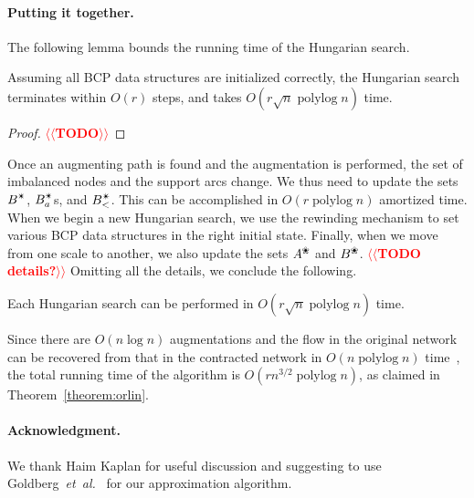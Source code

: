 \documentclass[11pt]{article}
\makeatletter
\def\etal{\emph{et~al.}}
\def\etal{\textit{et~al.}}
\def\polylog{\mathop{\mathrm{polylog}}}
\def\alive#1{{#1}^\text{\ding{96}}}
\def\star{\text{\ding{84}}}
\theoremstyle{plain}
\numberwithin{figure}{section}
\def\n@te#1{\textsf{\boldmath \textbf{$\langle\!\langle$#1$\rangle\!\rangle$}}\leavevmode}
\def\note#1{\textcolor{red}{\n@te{#1}}}
\makeatother
\begin{document}
\paragraph*{Putting it together.}
The following lemma bounds the running time of the Hungarian search.

\begin{lemma}
Assuming all BCP data structures are initialized correctly, the Hungarian search
terminates within $O(r)$ steps, and takes $O(r\sqrt{n}\polylog n)$ time.
\end{lemma}
\begin{proof}
\note{TODO} %
\end{proof}

Once an augmenting path is found and the augmentation is performed, the set of
imbalanced nodes and the support arcs change.
We thus need to update the sets $B^\star$, $B_a^\star$s, and $B_<^\star$.
This can be accomplished in $O(r\polylog n)$ amortized time.
When we begin a new Hungarian search, we use the rewinding mechanism
to set various BCP data structures in the right initial state.
Finally, when we move from one scale to another, we also update the sets
$\alive{A}$ and $\alive{B}$.
\note{TODO details?} %
Omitting all the details, we conclude the following.

\begin{lemma}
Each Hungarian search can be performed in $O(r\sqrt{n}\polylog n)$ time.
\end{lemma}

Since there are $O(n\log n)$ augmentations and the flow in the original network
can be recovered from that in the contracted network in $O(n\polylog n)$
time~\cite{AFPVX17arxiv}, the total running time of the algorithm is
$O(rn^{3/2}\polylog n)$, as claimed in Theorem~\ref{theorem:orlin}.


\paragraph*{Acknowledgment.}
We thank Haim Kaplan for useful discussion and suggesting to use Goldberg~\etal~\cite{GHKT17} for our approximation algorithm.
%
{


}

\appendix
\end{document}
